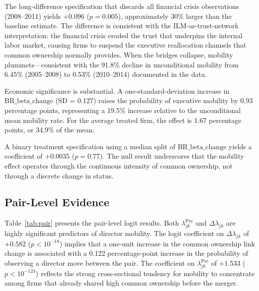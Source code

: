 \documentclass[11pt,a4paper]{article}
\begin{document}
The long-difference specification that discards all financial crisis observations (2008--2011) yields $+0.096$ ($p=0.005$), approximately 30\% larger than the baseline estimate. The difference is consistent with the ILM-as-trust-network interpretation: the financial crisis eroded the trust that underpins the internal labor market, causing firms to suspend the executive reallocation channels that common ownership normally provides. When the bridges collapse, mobility plummets---consistent with the 91.8\% decline in unconditional mobility from 6.45\% (2005--2008) to 0.53\% (2010--2014) documented in the data.

Economic significance is substantial. A one-standard-deviation increase in $\text{BR\_beta\_change}$ (SD = 0.127) raises the probability of executive mobility by 0.93 percentage points, representing a 19.5\% increase relative to the unconditional mean mobility rate. For the average treated firm, the effect is 1.67 percentage points, or 34.9\% of the mean.

A binary treatment specification using a median split of $\text{BR\_beta\_change}$ yields a coefficient of $+0.0035$ ($p=0.77$). The null result underscores that the mobility effect operates through the continuous intensity of common ownership, not through a discrete change in status.

\subsection{Pair-Level Evidence}

Table~\ref{tab:pair} presents the pair-level logit results. Both $\lambda_{jk}^{\text{Pre}}$ and $\Delta\lambda_{jk}$ are highly significant predictors of director mobility. The logit coefficient on $\Delta\lambda_{jk}$ of $+0.582$ ($p<10^{-18}$) implies that a one-unit increase in the common ownership link change is associated with a 0.122 percentage-point increase in the probability of observing a director move between the pair. The coefficient on $\lambda_{jk}^{\text{Pre}}$ of $+1.533$ ($p<10^{-124}$) reflects the strong cross-sectional tendency for mobility to concentrate among firms that already shared high common ownership before the merger.
\end{document}
